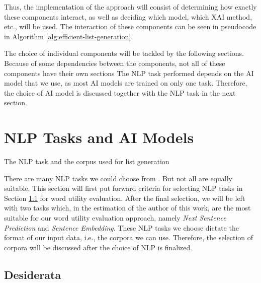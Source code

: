 Thus, the implementation of the approach will consist of determining how exactly these components interact, as well as deciding which model, which XAI method, etc., will be used.
The interaction of these components can be seen in pseudocode in Algorithm \ref{alg:efficient-list-generation}.



The choice of individual components will be tackled by the following sections.
Because of some dependencies between the components, not all of these components have their own sections
The NLP task performed depends on the AI model that we use, as most AI models are trained on only one task.
Therefore, the choice of AI model is discussed together with the NLP task in the next section.

\section{NLP Tasks and AI Models}
The NLP task and the corpus used for list generation

There are many NLP tasks we could choose from .
But not all are equally suitable.
This section will first put forward criteria for selecting NLP tasks in Section \ref{sec:nlp-tasks-desiderata} for word utility evaluation.
After the final selection, we will be left with two tasks which, in the estimation of the author of this work, are the most suitable for our word utility evaluation approach, namely \textit{Next Sentence Prediction} and \textit{Sentence Embedding}.
These NLP tasks we choose dictate the format of our input data, i.e., the corpora we can use.
Therefore, the selection of corpora will be discussed after the choice of NLP is finalized.

\subsection{Desiderata} \label{sec:nlp-tasks-desiderata}


